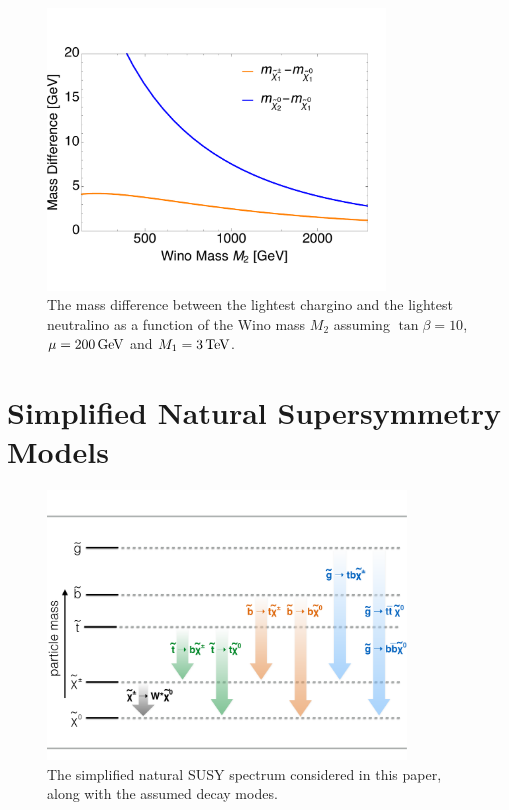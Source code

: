 \begin{figure}[tb!]
\centering
\includegraphics[width=0.8\textwidth,clip=true,viewport= 0 30 610 450]{figs/theory/neutralinos.pdf}
\caption{The mass difference between the lightest chargino and the
  lightest neutralino as a function of the Wino mass $M_2$
  assuming $\tan\beta=10$, $\mu=200 \,\text{Ge\hspace{-.08em}V}$ and $M_1 = 3 \,\text{Te\hspace{-.08em}V}$.\label{fig:neutralinos}}
\end{figure}

\section{Simplified Natural Supersymmetry Models}
\label{sec:sms}

\begin{figure}[htb!]
\centering
\includegraphics[width=0.85\textwidth]{figs/analysis8TeV/naturalSpectrum.pdf}
\caption{\label{fig:spectrum} The simplified natural SUSY spectrum
  considered in this paper, along with the assumed decay modes.}
\end{figure}

